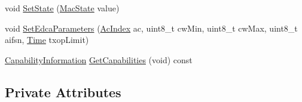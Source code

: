 \begin{DoxyCompactItemize}
\item 
void \hyperlink{classns3_1_1StaWifiMac_a1253ad1bd7821a1aedab2a7c847993b9}{Set\+State} (\hyperlink{classns3_1_1StaWifiMac_a262848fcb2046037198bd36fa86fbd2c}{Mac\+State} value)
\item 
void \hyperlink{classns3_1_1StaWifiMac_a9963539876f26c21aa9866bcf998cda7}{Set\+Edca\+Parameters} (\hyperlink{group__wifi_gab422b4562ba272b39a9b6bca3513f3ac}{Ac\+Index} ac, uint8\+\_\+t cw\+Min, uint8\+\_\+t cw\+Max, uint8\+\_\+t aifsn, \hyperlink{classns3_1_1Time}{Time} txop\+Limit)
\item 
\hyperlink{classns3_1_1CapabilityInformation}{Capability\+Information} \hyperlink{classns3_1_1StaWifiMac_a221366443a56ade6ce0b112a37bd4f6d}{Get\+Capabilities} (void) const 
\end{DoxyCompactItemize}
\subsection*{Private Attributes}
